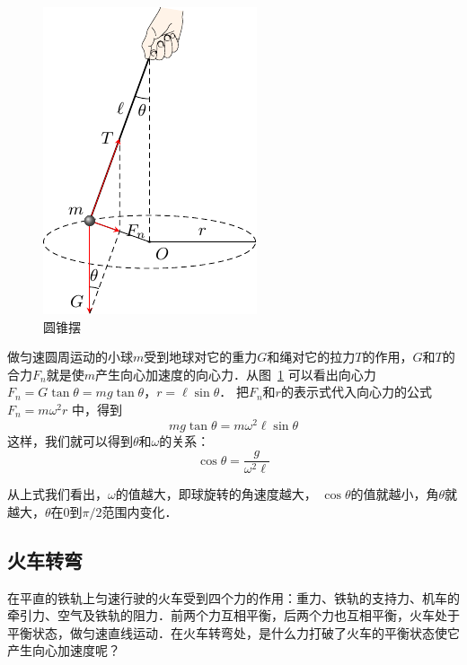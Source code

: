 \begin{figure}[htbp]
    \centering
    \includegraphics{fig/A/4-24.pdf}
    \caption{圆锥摆}\label{fig_A_4-24}
\end{figure}

做匀速圆周运动的小球$m$受到地球对它的重力$G$和绳对它的拉力$T$的作用，$G$和$T$的合力$F_n$就是使$m$产生向心加速度的向心力．从图~\ref{fig_A_4-24} 可以看出向心力
$F_n=G\tan \theta=mg\tan\theta $，$  r=\ell \sin\theta $．
把$F_n$和$r$的表示式代入向心力的公式$F_n=m\omega^2r$
中，得到
\[mg\tan\theta=m\omega^2\ell\sin\theta\]
这样，我们就可以得到$\theta$和$\omega$的关系：
\[\cos\theta =\frac{g}{\omega^2\ell } \]

从上式我们看出，$\omega$的值越大，即球旋转的角速度越大，
$\cos\theta$的值就越小，角$\theta$就越大，$\theta$在0到$\pi/2$范围内变化．

\subsection{火车转弯} 

在平直的铁轨上匀速行驶的火车受到四个力的作用：重力、铁轨的支持力、机车的牵引力、空气及铁轨的阻力．前两个力互相平衡，后两个力也互相平衡，火车处于平衡状态，做匀速直线运动．在火车转弯处，是什么力打破了火车的平衡状态使它产生向心加速度呢？

